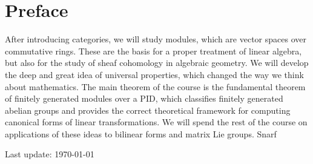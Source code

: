 \documentclass[11pt,oneside,openany]{memoir}
\begin{document}
\chapter*{Preface}
\vspace{-35pt}
\noindent After introducing categories, we will study modules, which are vector spaces over commutative rings. These are the basis for a proper treatment of linear algebra, but also for the study of sheaf cohomology in algebraic geometry. We will develop the deep and great idea of universal properties, which changed the way we think about mathematics. The main theorem of the course is the fundamental theorem of finitely generated modules over a PID, which classifies finitely generated abelian groups and provides the correct theoretical framework for computing canonical forms of linear transformations. We will spend the rest of the course on applications of these ideas to bilinear forms and matrix Lie groups. Snarf

\vspace{-35pt}
\tableofcontents
\vfill
\specialdate
Last update: \today

\end{document}
